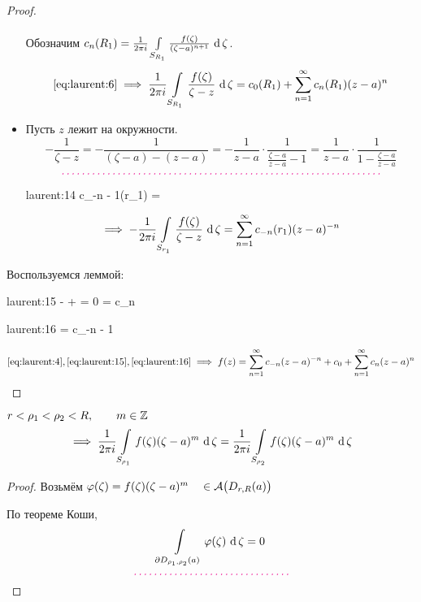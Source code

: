 \begin{proof}
\begin{itemize}
\begin{multline}
		\end{multline}
		Обозначим $ c_n(R_1) = \frac1{2\pi i}\cint[\zeta]{S_{R_1}}{\frac{f(\zeta)}{(\zeta - a)^{n + 1}}} $.
		$$ \eref{laurent:6} \implies \frac1{2\pi i} \cint[\zeta]{S_{R_1}}{\frac{f(\zeta)}{\zeta - z}} = c_0(R_1) + \sum_{n = 1}^\infty c_n(R_1)(z - a)^n $$
		\item Пусть $ z $ лежит на окружности.
		$$ -\frac1{\zeta - z} = -\frac1{(\zeta - a) - (z - a)} = -\frac1{z - a} \cdot \frac1{\frac{\zeta - a}{z - a} - 1} = \frac1{z - a} \cdot \frac1{1 - \frac{\zeta - a}{z - a}} $$
		$$ \comment{\widedots[10cm]} $$
		\begin{equ}{laurent:14}
			c_{-n - 1}(r_1) =  
		\end{equ}
		$$ \implies -\frac1{2\pi i}\cint[\zeta]{S_{r_1}}{\frac{f(\zeta)}{\zeta - z}} = \sum_{n = 1}^\infty c_{-n}(r_1) (z - a)^{-n} $$
	\end{itemize}

	Воспользуемся леммой:
	\begin{equ}{laurent:15}
		\iff - +  = 0 \iff {} =   \bydef c_n
	\end{equ}
	\begin{equ}{laurent:16}
		  =  \bydef c_{-n - 1}
	\end{equ}
	$$ \eref{laurent:4}, \eref{laurent:15}, \eref{laurent:16} \implies f(z) = \sum_{n = 1}^\infty c_{-n}(z - a)^{-n} + c_0 + \sum_{n = 1}^\infty c_n(z - a)^n $$
\end{proof}

\begin{lemma}
	$ r < \rho_1 < \rho_2 < R, \qquad m \in \Z $
	$$ \implies \frac1{2\pi i} \cint[\zeta]{S_{\rho_1}}{f(\zeta)(\zeta - a)^m} = \frac1{2\pi i}\cint[\zeta]{S_{\rho_2}}{f(\zeta)(\zeta - a)^m} $$
\end{lemma}

\begin{proof}
	Возьмём $ \vphi(\zeta) = f(\zeta)(\zeta - a)^m \quad \in \mathcal A \big( D_{r, R}(a) \big) $

	По теореме Коши,
	$$ \cint[\zeta]{\partial D_{\rho_1, \rho_2}(a)}{\vphi(\zeta)} = 0 $$
	$$ \comment{\widedots[5cm]} $$
\end{proof}

